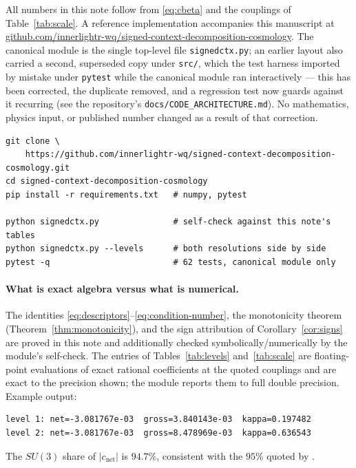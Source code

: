 \documentclass[11pt]{article}
\theoremstyle{definition}
\theoremstyle{remark}
\newcommand{\net}{c_{\mathrm{net}}}
\begin{document}
All numbers in this note follow from \eqref{eq:cbeta} and the couplings of Table~\ref{tab:scale}.
A reference implementation accompanies this manuscript at
\href{https://github.com/innerlightr-wq/signed-context-decomposition-cosmology}{github.com/innerlightr-wq/signed-context-decomposition-cosmology}. The canonical
module is the single top-level file \texttt{signedctx.py}; an earlier layout also carried a second,
superseded copy under \texttt{src/}, which the test harness imported by mistake under \texttt{pytest}
while the canonical module ran interactively --- this has been corrected, the duplicate removed,
and a regression test now guards against it recurring (see the repository's
\texttt{docs/CODE\_ARCHITECTURE.md}). No mathematics, physics input, or published number changed as
a result of that correction.

\begingroup\small
\begin{verbatim}
git clone \
    https://github.com/innerlightr-wq/signed-context-decomposition-cosmology.git
cd signed-context-decomposition-cosmology
pip install -r requirements.txt   # numpy, pytest

python signedctx.py               # self-check against this note's tables
python signedctx.py --levels      # both resolutions side by side
pytest -q                         # 62 tests, canonical module only
\end{verbatim}
\endgroup

\paragraph{What is exact algebra versus what is numerical.} The identities
\eqref{eq:descriptors}--\eqref{eq:condition-number}, the monotonicity theorem
(Theorem~\ref{thm:monotonicity}), and the sign attribution of Corollary~\ref{cor:signs} are proved
in this note and additionally checked symbolically/numerically by the module's self-check. The
entries of Tables~\ref{tab:levels} and~\ref{tab:scale} are floating-point evaluations of exact
rational coefficients at the quoted couplings and are exact to the precision shown; the module
reports them to full double precision. Example output:
\begingroup\small
\begin{verbatim}
level 1: net=-3.081767e-03  gross=3.840143e-03  kappa=0.197482
level 2: net=-3.081767e-03  gross=8.478969e-03  kappa=0.636543
\end{verbatim}
\endgroup
The $SU(3)$ share of $|\net|$ is $94.7\%$, consistent with the $95\%$ quoted by
\citet{TurokBoyle2023}.
\end{document}
